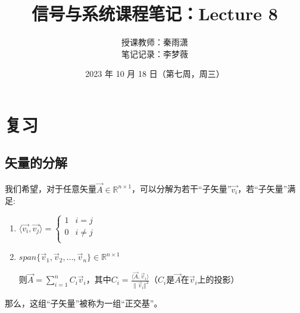 \documentclass[UTF8]{ctexart}
\begin{document}
\title{信号与系统课程笔记：Lecture 8}
\author{授课教师：秦雨潇 \\
        笔记记录：李梦薇}
\date{2023 年 10 月 18 日（第七周，周三）}
\maketitle

\section{复习}
\subsection{矢量的分解}
我们希望，对于任意矢量$\vec{A}\in \mathbb{R} ^{n\times 1}$，可以分解为若干“子矢量”$\vec{v_i}$，若“子矢量”满足:\par
\begin{enumerate}[label=(\arabic*),itemindent=0pt,labelindent=\parindent,labelwidth=2em,labelsep=5pt,leftmargin=*]
    \item $\langle{\vec{v_i},\vec{v_j}}\rangle=\left\{
          \begin{array}{cl}
          1 &  i=j \\
          0 &  i\neq{j} \\
          \end{array} \right.$\par
    \item $span\{\vec{v}_1,\vec{v}_2,\ldots,\vec{v}_n\}\in\mathbb{R}^{n\times1}$\par
          则$\vec{A}=\sum_{i=1}^{n}C_i\vec{v}_i$，其中$C_i=\frac{\langle{\vec{A},\vec{v}_i}\rangle}{\|\vec{v}_i\Vert^2}$（$C_i$是$\vec{A}$在$\vec{v}_i$上的投影）\par
\end{enumerate}\par
那么，这组“子矢量”被称为一组“正交基”。\par
\end{document}

